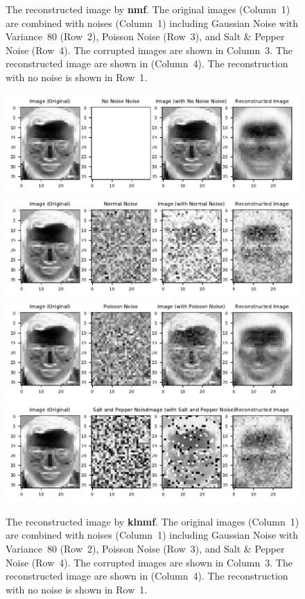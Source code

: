 \begin{figure}
	\caption{The reconstructed image by \textbf{nmf}. The original images (Column~1) are combined with noises (Column~1) including Gaussian Noise with Variance~$80$ (Row~2), Poisson Noise (Row~3), and Salt \& Pepper Noise (Row~4). The corrupted images are shown in Column~3. The reconstructed image are shown in (Column~4). The reconstruction with no noise is shown in Row~1.}
	\label{fig:noise}
\end{figure}
\begin{figure}\label{noisesklnmf}
	\centering
	\includegraphics[scale=.9]{Result_Multiplication_KL_Divergence_No_Noise_Comparison}\\
	\includegraphics[scale=.9]{Result_Multiplication_KL_Divergence_Normal_Comparison}\\
	\includegraphics[scale=.9]{Result_Multiplication_KL_Divergence_Poisson_Comparison}\\
	\includegraphics[scale=.9]{Result_Multiplication_KL_Divergence_Salt_and_Pepper_Comparison}
\caption{The reconstructed image by \textbf{klnmf}. The original images (Column~1) are combined with noises (Column~1) including Gaussian Noise with Variance~$80$ (Row~2), Poisson Noise (Row~3), and Salt \& Pepper Noise (Row~4). The corrupted images are shown in Column~3. The reconstructed image are shown in (Column~4). The reconstruction with no noise is shown in Row~1.}
	\label{fig:noise}
\end{figure}